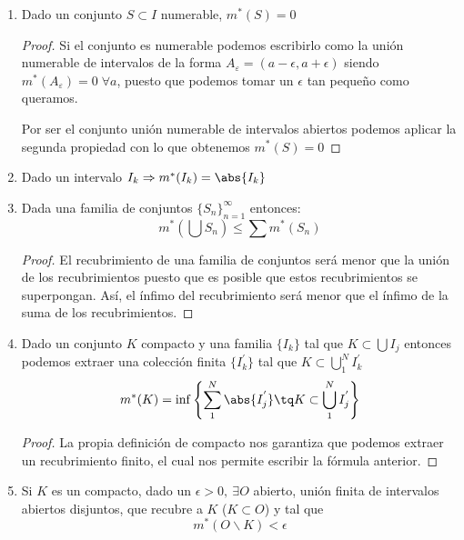 \documentclass{apuntes}
\begin{document}
\begin{enumerate}
\begin{proof}
Por tanto queda claro que no puede ser $m^*(S) < \inf m^*(O)$.
\end{proof}

%
\item Dado un conjunto $S \subset I$ numerable, $m^*(S)=0$
\begin{proof}
Si el conjunto es numerable podemos escribirlo como la unión numerable de intervalos de la forma $A_ε = (a-\epsilon, a +\epsilon)$ siendo $m^*(A_ε)=0\; \forall a$, puesto que podemos tomar un $\epsilon$ tan pequeño como queramos.

Por ser el conjunto unión numerable de intervalos abiertos podemos aplicar la segunda propiedad con lo que obtenemos $m^*(S)=0$
\end{proof}

%
\item Dado un intervalo $I_k \Rightarrow m^*(I_k)=\abs{I_k}$

%
\item Dada una familia de conjuntos $\lbrace S_n\rbrace_{n=1}^{\infty}$  entonces:
\[m^*\left(\bigcup S_n\right) \leq \sum m^*(S_n)\]
\begin{proof}
El recubrimiento de una familia de conjuntos será menor que la unión de los recubrimientos puesto que es posible que estos recubrimientos se superpongan. Así, el ínfimo del recubrimiento será menor que el ínfimo de la suma de los recubrimientos.
\end{proof}


%
\item Dado un conjunto $K$ compacto y una familia $\lbrace I_k \rbrace$ tal que $K \subset \bigcup I_j$ entonces podemos extraer una colección finita $\lbrace I_k^{'} \rbrace$ tal que $K \subset \bigcup_1^N I_k^{'}$
\[m^*(K) = \inf\left\{\sum_1^N \abs{I_j^{'}} \tq K\subset \bigcup_1^N I_j^{'} \right\}\]
\begin{proof}
La propia definición de compacto nos garantiza que podemos extraer un recubrimiento finito, el cual nos permite escribir la fórmula anterior.
\end{proof}

%
\item Si $K$ es un compacto, dado un $\epsilon > 0, \ \exists O$ abierto, unión finita de intervalos abiertos disjuntos, que recubre a $K$ ($K\subset O$) y tal que
\[m^*(O\smallsetminus K) < \epsilon\]


\end{enumerate}
\end{document}

